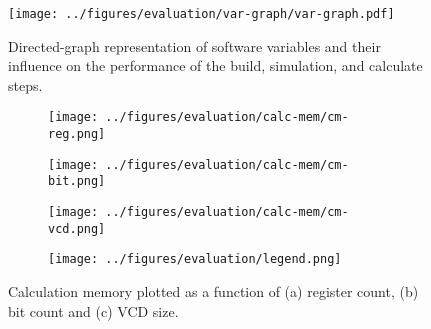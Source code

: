 \begin{figure}[H]
  \centering
  \texttt{[image: ../figures/evaluation/var-graph/var-graph.pdf]}
  \caption{Directed-graph representation of \sysname{} software variables and
    their influence on the performance of the build, simulation, and calculate
    steps.}
  \label{fig:var-graph} 
\end{figure}

\begin{figure}[H]
  \centering
  \begin{subfigure}[T]{0.49\textwidth}
    \texttt{[image: ../figures/evaluation/calc-mem/cm-reg.png]}
    \caption{}
    \label{fig:cm-reg}
  \end{subfigure}
  \begin{subfigure}[T]{0.49\textwidth}
    \texttt{[image: ../figures/evaluation/calc-mem/cm-bit.png]}
    \caption{}
    \label{fig:cm-bit}
  \end{subfigure}
  \begin{subfigure}[T]{0.49\textwidth}
    \texttt{[image: ../figures/evaluation/calc-mem/cm-vcd.png]}
    \caption{}
    \label{fig:cm-vcd}
  \end{subfigure}
  \begin{subfigure}[T]{0.49\textwidth}
    \parbox{\textwidth}{\centering\texttt{[image: ../figures/evaluation/legend.png]}}
    \label{fig:cm-legend}
  \end{subfigure}
  \caption{Calculation memory plotted as a function of (a) register count, (b)
    bit count and (c) VCD size.}
  \label{fig:calc-mem}
\end{figure}

